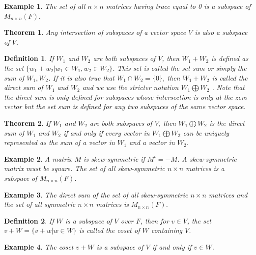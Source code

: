 \documentclass[a4paper]{article}
\newtheorem{mytheorem}{Theorem}
\newtheorem{example}{Example}
\newtheorem{mydef}{Definition}
\numberwithin{mytheorem}{section}
\numberwithin{mydef}{section}
\numberwithin{example}{section}
\begin{document}
\begin{example} The set of all $n \times n$ matrices having trace equal to 0 is a subspace of $M_{n \times n}(F)$. 
\end{example}

\begin{mytheorem} Any intersection of subspaces of a vector space $V$ is also a subspace of $V$.
\end{mytheorem}

\begin{mydef} If $W_{1}$ and $W_{2}$ are both subspaces of $V$, then $W_{1} + W_{2}$ is defined as the set $\{ w_{1} + w_{2} | w_{1} \in W_{1}, w_{2} \in W_{2} \}$. This set is called the set sum or simply the sum of $W_{1},W_{2}$. If it is also true that $W_{1} \cap W_{2} = \{ 0\}$, then $W_{1} + W_{2}$ is called the direct sum of $W_{1}$ and $W_{2}$ and we use the stricter notation $W_{1} \bigoplus W_{2}$ . Note that the direct sum is only defined for subspaces whose intersection is only at the zero vector but the set sum is defined for any two subspaces of the same vector space.
\end{mydef}

\begin{mytheorem}  If $W_{1}$ and $W_{2}$ are both subspaces of $V$, then $W_{1} \bigoplus W_{2}$ is the direct sum of $W_{1}$ and $W_{2}$ if and only if every vector in $W_{1} \bigoplus W_{2}$ can be uniquely represented as the sum of a vector in $W_{1}$ and a vector in $W_{2}$. 
\end{mytheorem}

\begin{example} A matrix $M$ is skew-symmetric if $M^{t} = -M$. A skew-symmetric matrix must be square. The set of all skew-symmetric $n \times n$ matrices is a subspace of $M_{n \times n}(F)$. 
\end{example}

\begin{example} The direct sum of the set of all skew-symmetric $n \times n$ matrices and the set of all symmetric $n \times n$ matrices is $M_{n \times n}(F)$.
\end{example}

\begin{mydef} If $W$ is a subspace of $V$ over $F$, then for $v \in V$, the set $v + W = \{ v + w | w \in W \}$ is called the coset of $W$ containing $V$. 
\end{mydef}

\begin{example} The coset $v + W$ is a subspace of $V$ if and only if $v \in W$.
\end{example}
\end{document}
